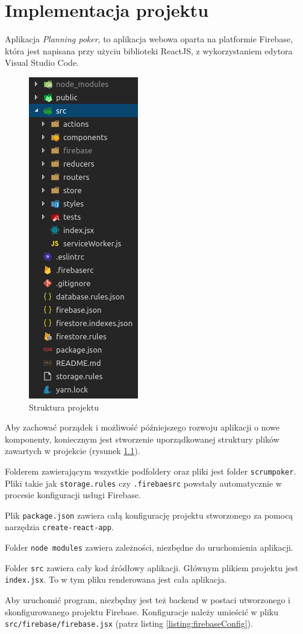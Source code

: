 \chapter{Implementacja projektu}

Aplikacja \textit{Planning poker}, to aplikacja webowa oparta na platformie Firebase,
która jest napisana przy użyciu biblioteki ReactJS, z wykorzystaniem
edytora Visual Studio Code.

\begin{figure}
	\centering\includegraphics[width=.2\textwidth]{img/projekt}
	\caption{Struktura projektu}\label{rys:projekt}%
\end{figure}

Aby zachować porządek i możliwość późniejszego rozwoju aplikacji o nowe komponenty,
koniecznym jest stworzenie uporządkowanej struktury plików zawartych w projekcie
(rysunek \ref{rys:projekt}).

Folderem zawierającym wszystkie podfoldery oraz pliki jest folder \texttt{scrumpoker}.
Pliki takie jak \texttt{storage.rules} czy \texttt{.firebaesrc} powstały automatycznie
w procesie konfiguracji usługi Firebase.

Plik \texttt{package.json} zawiera całą konfigurację projektu stworzonego
za pomocą narzędzia \texttt{create-react-app}.

Folder \texttt{node modules} zawiera zależności, niezbędne do uruchomienia aplikacji.

Folder \texttt{src} zawiera cały kod źródłowy aplikacji.
Głównym plikiem projektu jest \texttt{index.jsx}. To w tym pliku renderowana jest cała aplikacja.

Aby uruchomić program, niezbędny jest też backend w postaci utworzonego
i skonfigurowanego projektu Firebase.
Konfiguracje należy umieścić w pliku \texttt{src/firebase/firebase.jsx}
(patrz listing \ref{listing:firebaseConfig}).

